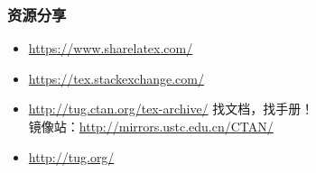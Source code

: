     \begin{frame}[fragile]
        \frametitle{资源分享}
        \begin{itemize}
            \item \url{https://www.sharelatex.com/}
            \item \url{https://tex.stackexchange.com/}
            \item \url{http://tug.ctan.org/tex-archive/} 找文档，找手册！\\
            镜像站：\url{http://mirrors.ustc.edu.cn/CTAN/}
            \item \url{http://tug.org/}
        \end{itemize}
    \end{frame}